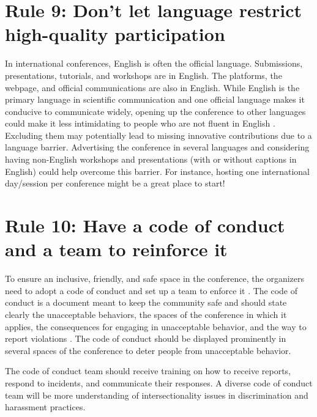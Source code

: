 \documentclass[10pt,letterpaper]{article}
\begin{document}
\section*{Rule 9: Don't let language restrict high-quality participation}

In international conferences, English is often the official language. Submissions, presentations, tutorials, and workshops are in English. The platforms, the webpage, and official communications are also in English. While English is the primary language in scientific communication and one official language makes it conducive to communicate widely, opening up the conference to other languages could make it less intimidating to people who are not fluent in English \cite{niner_better_2021}. Excluding them may potentially lead to missing innovative contributions due to a language barrier. Advertising the conference in several languages and considering having non-English workshops and presentations (with or without captions in English) could help overcome this barrier. For instance, hosting one international day/session per conference might be a great place to start!

\section*{Rule 10: Have a code of conduct and a team to reinforce it}

To ensure an inclusive, friendly, and safe space in the conference, the organizers need to adopt a code of conduct and set up a team to enforce it \cite{favaro_your_2016}. The code of conduct is a document meant to keep the community safe and should state clearly the unacceptable behaviors, the spaces of the conference in which it applies, the consequences for engaging in unacceptable behavior, and the way to report violations \cite{aurora_how_2018}.%
The code of conduct should be displayed prominently in several spaces of the conference to deter people from unacceptable behavior.

The code of conduct team should receive training on how to receive reports, respond to incidents, and communicate their responses. A diverse code of conduct team will be more understanding of intersectionality issues in discrimination and harassment practices. 
\end{document}
